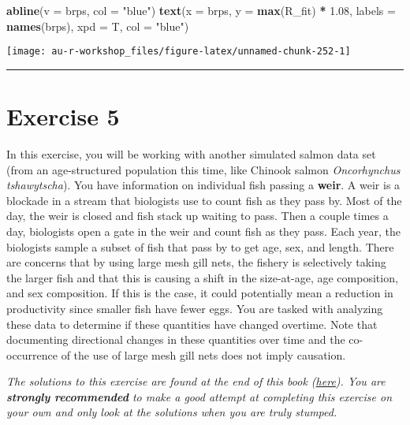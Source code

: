 \documentclass[]{book}
\newenvironment{Shaded}{\begin{snugshade}}{\end{snugshade}}
\newcommand{\KeywordTok}[1]{\textcolor[rgb]{0.13,0.29,0.53}{\textbf{#1}}}
\newcommand{\DataTypeTok}[1]{\textcolor[rgb]{0.13,0.29,0.53}{#1}}
\newcommand{\FloatTok}[1]{\textcolor[rgb]{0.00,0.00,0.81}{#1}}
\newcommand{\StringTok}[1]{\textcolor[rgb]{0.31,0.60,0.02}{#1}}
\newcommand{\OperatorTok}[1]{\textcolor[rgb]{0.81,0.36,0.00}{\textbf{#1}}}
\newcommand{\NormalTok}[1]{#1}
\theoremstyle{definition}
\theoremstyle{definition}
\theoremstyle{definition}
\theoremstyle{remark}
\begin{document}
\begin{Shaded}
\begin{Highlighting}[]
\KeywordTok{abline}\NormalTok{(}\DataTypeTok{v =}\NormalTok{ brps, }\DataTypeTok{col =} \StringTok{"blue"}\NormalTok{)}
\KeywordTok{text}\NormalTok{(}\DataTypeTok{x =}\NormalTok{ brps, }\DataTypeTok{y =} \KeywordTok{max}\NormalTok{(R_fit) }\OperatorTok{*}\StringTok{ }\FloatTok{1.08}\NormalTok{, }
     \DataTypeTok{labels =} \KeywordTok{names}\NormalTok{(brps), }\DataTypeTok{xpd =}\NormalTok{ T, }\DataTypeTok{col =} \StringTok{"blue"}\NormalTok{)}
\end{Highlighting}
\end{Shaded}

\begin{center}\texttt{[image: au-r-workshop\_files/figure-latex/unnamed-chunk-252-1]} \end{center}

\begin{center}\rule{0.5\linewidth}{\linethickness}\end{center}

\section*{Exercise 5}\label{exercise-5}

In this exercise, you will be working with another simulated salmon data
set (from an age-structured population this time, like Chinook salmon
\emph{Oncorhynchus tshawytscha}). You have information on individual
fish passing a \textbf{weir}. A weir is a blockade in a stream that
biologists use to count fish as they pass by. Most of the day, the weir
is closed and fish stack up waiting to pass. Then a couple times a day,
biologists open a gate in the weir and count fish as they pass. Each
year, the biologists sample a subset of fish that pass by to get age,
sex, and length. There are concerns that by using large mesh gill nets,
the fishery is selectively taking the larger fish and that this is
causing a shift in the size-at-age, age composition, and sex
composition. If this is the case, it could potentially mean a reduction
in productivity since smaller fish have fewer eggs. You are tasked with
analyzing these data to determine if these quantities have changed
overtime. Note that documenting directional changes in these quantities
over time and the co-occurrence of the use of large mesh gill nets does
not imply causation.

\emph{The solutions to this exercise are found at the end of this book
(\protect\hyperlink{ex5-answers}{here}). You are \textbf{strongly
recommended} to make a good attempt at completing this exercise on your
own and only look at the solutions when you are truly stumped.}
\end{document}
